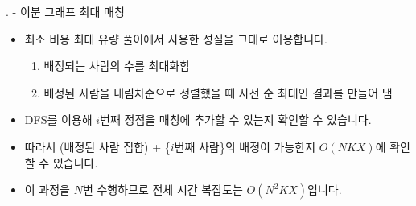 \begin{frame}{\probno{}. \probtitle{} - 이분 그래프 최대 매칭}
    \begin{itemize}
        \item 최소 비용 최대 유량 풀이에서 사용한 성질을 그대로 이용합니다.

        \begin{enumerate}
            \item 배정되는 사람의 수를 최대화함
            \item 배정된 사람을 내림차순으로 정렬했을 때 사전 순 최대인 결과를 만들어 냄
        \end{enumerate}
        \vspace{3mm}
        \item DFS를 이용해 $i$번째 정점을 매칭에 추가할 수 있는지 확인할 수 있습니다.
        \item 따라서 (배정된 사람 집합) + \{$i$번째 사람\}의 배정이 가능한지 $O(NKX)$에 확인할 수 있습니다.
        \item 이 과정을 $N$번 수행하므로 전체 시간 복잡도는 $O(N^2KX)$입니다.
    \end{itemize}
\end{frame}